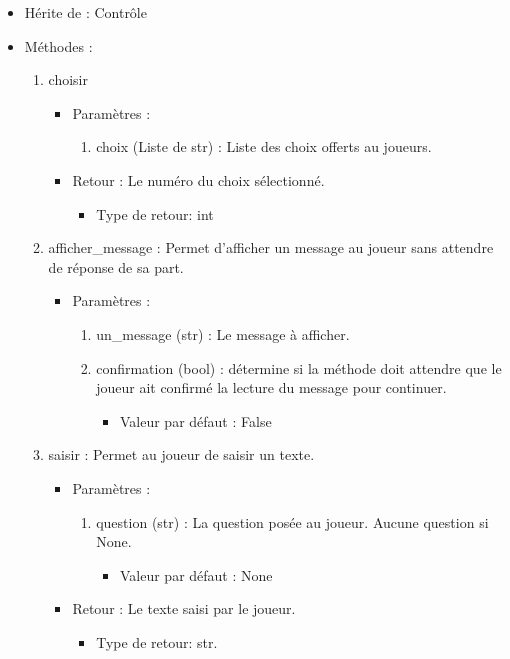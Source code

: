 \documentclass[12pt,pdftex,oneside]{article}
\begin{document}
  \begin{itemize}

  \item Hérite de : Contrôle
  \item Méthodes : 
    \begin{enumerate}

    \item choisir
      \begin{itemize}
      \item Paramètres : 
        \begin{enumerate}
        \item choix (Liste de str) : Liste des choix offerts au joueurs.
        \end{enumerate}
      \item Retour : Le numéro du choix sélectionné.
          \begin{itemize}
          \item Type de retour: int
          \end{itemize}
      \end{itemize}

    \item afficher\_message : Permet d'afficher un message au joueur sans
      attendre de réponse de sa part.
      \begin{itemize}
      \item Paramètres : 
        \begin{enumerate}
        \item un\_message (str) : Le message à afficher.
        \item confirmation (bool) : détermine si la méthode doit attendre que le joueur
          ait confirmé la lecture du message pour continuer.
          \begin{itemize}
          \item Valeur par défaut : False
          \end{itemize}
        \end{enumerate}
      \end{itemize}

    \item saisir : Permet au joueur de saisir un texte.
      \begin{itemize}
      \item Paramètres : 
        \begin{enumerate}
        \item question (str) : La question posée au joueur. Aucune question si
          None.
          \begin{itemize}
          \item Valeur par défaut : None
          \end{itemize}
        \end{enumerate}
      \item Retour : Le texte saisi par le joueur.
          \begin{itemize}
          \item Type de retour: str.
          \end{itemize}
      \end{itemize}


\end{enumerate}
\end{itemize}
\end{document}
